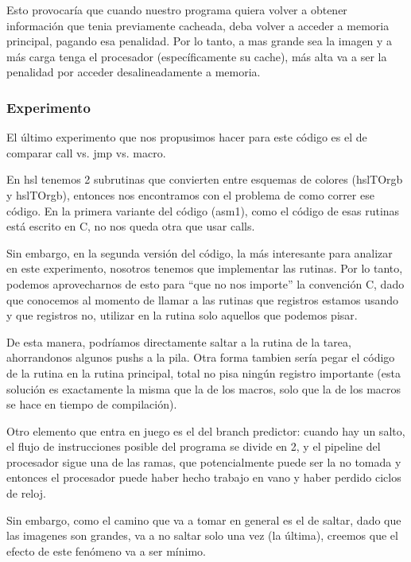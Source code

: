 Esto provocaría que cuando nuestro programa quiera volver a obtener información que tenia previamente cacheada, deba volver a acceder a memoria principal, pagando esa penalidad. Por lo tanto, a mas grande sea la imagen y a más carga tenga el procesador (específicamente su cache), más alta va a ser la penalidad por acceder desalineadamente a memoria.

\subsubsection*{Experimento}
El último experimento que nos propusimos hacer para este código es el de comparar call vs. jmp vs. macro.

En hsl tenemos 2 subrutinas que convierten entre esquemas de colores (hslTOrgb y hslTOrgb), entonces nos encontramos con el problema de como correr ese código. En la primera variante del código (asm1), como el código de esas rutinas está escrito en C, no nos queda otra que usar calls.

Sin embargo, en la segunda versión del código, la más interesante para analizar en este experimento, nosotros tenemos que implementar las rutinas. Por lo tanto, podemos aprovecharnos de esto para ``que no nos importe'' la convención C, dado que conocemos al momento de llamar a las rutinas que registros estamos usando y que registros no, utilizar en la rutina solo aquellos que podemos pisar.

De esta manera, podríamos directamente saltar a la rutina de la tarea, ahorrandonos algunos pushs a la pila. Otra forma tambien sería pegar el código de la rutina en la rutina principal, total no pisa ningún registro importante (esta solución es exactamente la misma que la de los macros, solo que la de los macros se hace en tiempo de compilación).

Otro elemento que entra en juego es el del branch predictor: cuando hay un salto, el flujo de instrucciones posible del programa se divide en 2, y el pipeline del procesador sigue una de las ramas, que potencialmente puede ser la no tomada y entonces el procesador puede haber hecho trabajo en vano y haber perdido ciclos de reloj.

Sin embargo, como el camino que va a tomar en general es el de saltar, dado que las imagenes son grandes, va a no saltar solo una vez (la última), creemos que el efecto de este fenómeno va a ser mínimo.

